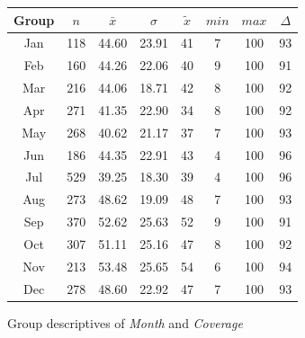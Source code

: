 \begin{figure}[ht!]
	\centering
	\begin{minipage}{0.5\textwidth}
		\tiny
		\setlength{\tabcolsep}{4pt}
		\centering
		\begin{tabular}{c|c|c|c|c|c|c|c}
			\toprule
			Group & $n$ & $\bar{x}$ & $\sigma$ & $\tilde{x}$ & $min$ & $max$ & $\Delta$ \\
			\midrule
			Jan & 118 & 44.60 & 23.91 & 41 & 7 & 100 & 93 \\ 
			Feb & 160 & 44.26 & 22.06 & 40 & 9 & 100 & 91 \\ 
			Mar & 216 & 44.06 & 18.71 & 42 & 8 & 100 & 92 \\ 
			Apr & 271 & 41.35 & 22.90 & 34 & 8 & 100 & 92 \\ 
			May & 268 & 40.62 & 21.17 & 37 & 7 & 100 & 93 \\ 
			Jun & 186 & 44.35 & 22.91 & 43 & 4 & 100 & 96 \\ 
			Jul & 529 & 39.25 & 18.30 & 39 & 4 & 100 & 96 \\ 
			Aug & 273 & 48.62 & 19.09 & 48 & 7 & 100 & 93 \\ 
			Sep & 370 & 52.62 & 25.63 & 52 & 9 & 100 & 91 \\ 
			Oct & 307 & 51.11 & 25.16 & 47 & 8 & 100 & 92 \\ 
			Nov & 213 & 53.48 & 25.65 & 54 & 6 & 100 & 94 \\ 
			Dec & 278 & 48.60 & 22.92 & 47 & 7 & 100 & 93 \\ 
			\bottomrule
		\end{tabular}
		\label{tbl:descriptives_arbis_matched_Month_Cov}
	\end{minipage}%
	\begin{minipage}{0.55\textwidth}
		\tiny
		\centering
		\vfill
		\label{fig:descriptives_arbis_matched_Month_Cov}
	\end{minipage}%
	\caption{Group descriptives of \textit{Month} and \textit{Coverage}}
\end{figure}

